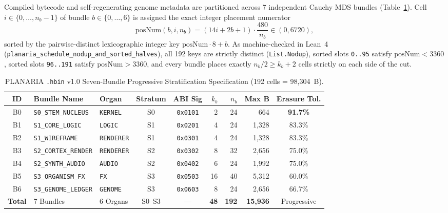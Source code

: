 \documentclass[11pt,letterpaper]{article}
\theoremstyle{remark}
\begin{document}
Compiled bytecode and self-regenerating genome metadata are partitioned across 7 independent Cauchy MDS bundles (Table~\ref{tab:bundles}). Cell $i\in\{0,\dots,n_b-1\}$ of bundle $b\in\{0,\dots,6\}$ is assigned the exact integer placement numerator
\begin{equation}
  \mathrm{posNum}(b, i, n_b) = (14i + 2b + 1)\cdot\frac{480}{n_b} \in (0, 6720),
\end{equation}
sorted by the pairwise-distinct lexicographic integer key $\mathrm{posNum}\cdot 8 + b$. As machine-checked in Lean~4 (\texttt{planaria\_\allowbreak schedule\_\allowbreak nodup\_\allowbreak and\_\allowbreak sorted\_\allowbreak halves}), all 192 keys are strictly distinct (\texttt{List.Nodup}), sorted slots \texttt{0..95} satisfy $\mathrm{posNum} < 3360$, sorted slots \texttt{96..191} satisfy $\mathrm{posNum} > 3360$, and every bundle places exactly $n_b/2 \ge k_b + 2$ cells strictly on each side of the cut.

\begin{table}[ht]
\centering
\caption{PLANARIA \texttt{.hbin} v1.0 Seven-Bundle Progressive Stratification Specification (192 cells = 98,304~B).}
\label{tab:bundles}
\footnotesize
\begin{tabular}{@{}cllccrrrc@{}}
\toprule
\textbf{ID} & \textbf{Bundle Name} & \textbf{Organ} & \textbf{Stratum} & \textbf{ABI Sig} & $k_b$ & $n_b$ & \textbf{Max B} & \textbf{Erasure Tol.} \\
\midrule
B0 & \texttt{S0\_STEM\_NUCLEUS}   & \texttt{KERNEL}   & S0 & \texttt{0x0101} &  2 & 24 &   664 & \textbf{91.7\%} \\
B1 & \texttt{S1\_CORE\_LOGIC}     & \texttt{LOGIC}    & S1 & \texttt{0x0201} &  4 & 24 & 1,328 & 83.3\% \\
B2 & \texttt{S1\_WIREFRAME}       & \texttt{RENDERER} & S1 & \texttt{0x0301} &  4 & 24 & 1,328 & 83.3\% \\
B3 & \texttt{S2\_CORTEX\_RENDER}  & \texttt{RENDERER} & S2 & \texttt{0x0302} &  8 & 32 & 2,656 & 75.0\% \\
B4 & \texttt{S2\_SYNTH\_AUDIO}    & \texttt{AUDIO}    & S2 & \texttt{0x0402} &  6 & 24 & 1,992 & 75.0\% \\
B5 & \texttt{S3\_ORGANISM\_FX}    & \texttt{FX}       & S3 & \texttt{0x0503} & 16 & 40 & 5,312 & 60.0\% \\
B6 & \texttt{S3\_GENOME\_LEDGER}  & \texttt{GENOME}   & S3 & \texttt{0x0603} &  8 & 24 & 2,656 & 66.7\% \\
\midrule
\textbf{Total} & 7 Bundles & 6 Organs & S0--S3 & --- & \textbf{48} & \textbf{192} & \textbf{15,936} & Progressive \\
\bottomrule
\end{tabular}
\end{table}
\end{document}
